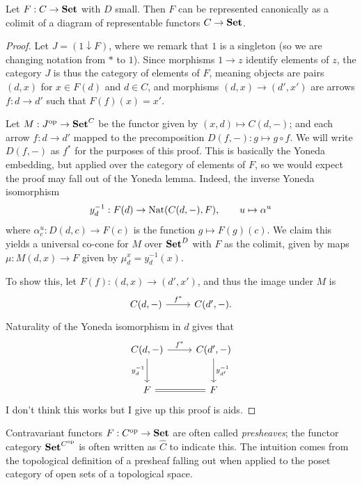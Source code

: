 \begin{theorem}\label{thm:3.2}
	Let $F : C \to \mathbf{Set} $ with $D$ small. Then $F$ can be represented canonically as a colimit of a diagram of representable functors $C\to \mathbf{Set} $.
\end{theorem}
\begin{proof}
	Let $J=(1\downarrow F)$, where we remark that $1$ is a singleton (so we are changing notation from $*$ to $1$). Since morphisms $1\to z$ identify elements of $z$, the category $J$ is thus the category of elements of $F$, meaning objects are pairs $(d,x)$ for $x\in F(d)$ and $d\in C$, and morphisms $(d,x)\to (d',x')$ are arrows $f : d \to d'$ such that $F(f)(x)=x'$.

	Let $M : J^{\mathrm{op} }  \to \mathbf{Set} ^C$ be the functor given by $(x,d)\mapsto C(d,-)$; and each arrow $f : d \to d'$ mapped to the precomposition $D(f,-) : g \mapsto g\circ f$. We will write $D(f,-)$ as $f^*$ for the purposes of this proof. This is basically the Yoneda embedding, but applied over the category of elements of $F$, so we would expect the proof may fall out of the Yoneda lemma. Indeed, the inverse Yoneda isomorphism
	\[
		y^{-1}_d : F(d) \to \operatorname{Nat}(C(d,-),F),\qquad u\mapsto \alpha^u
	\]
	where $\alpha ^u_c : D(d,c) \to F(c)$ is the function $g\mapsto F(g)(c)$. We claim this yields a universal co-cone for $M$ over $\mathbf{Set} ^D$ with $F$ as the colimit, given by maps $\mu : M(d,x) \to F$ given by $\mu _d^x = y^{-1}_d(x)$.

	To show this, let $F(f) : (d,x) \to (d',x')$, and thus the image under $M$ is
	\[\begin{tikzcd}[row sep = 2.5em, column sep = 2.5em]
	C(d,-)\ar[" f^* ", r]  & C(d',-).
	\end{tikzcd}\]
	Naturality of the Yoneda isomorphism in $d$ gives that
	\[\begin{tikzcd}[row sep = 2.5em, column sep = 2.5em]
	C(d,-)\ar[" f^* ", r] \ar[" y_d^{-1}  "', d]  & C(d',-)\ar[" y_{d'} ^{-1}  ", d]  \\
	F\ar[equals, r]  & F
	\end{tikzcd}\]
	I don't think this works but I give up this proof is aids.
\end{proof}

Contravariant functors $F : C^{\mathrm{op} }  \to \mathbf{Set} $ are often called \emph{presheaves}; the functor category $\mathbf{Set} ^{C^{\mathrm{op} } } $ is often written as $\hat{C} $ to indicate this. The intuition comes from the topological definition of a presheaf falling out when applied to the poset category of open sets of a topological space.

